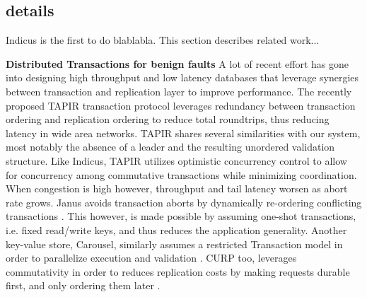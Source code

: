 \iffalse


For ex: Both CF SMR [cite a gazillion] and BFT SMR [cite a gazillion] focus on maintaining a totally ordered log of requests
Permission blockchains, as they rely primarily on BFT constructs similarly maintain this total order
[cite a gazillion]

There is some work that recognizes that this is not scalable and instead tries to only order conflicting ops [Epaxos, Generalised Paxos, Ava, Iota, CPPaxos or whatever it's called], or add sharding [OmniLedger, Herlihy's paper]
In the CF context, layering sharding on top of  replication has been shown to be inefficient [Tapir, Janus]
We argue that we should think of blockchains as a DB. There is some work that does that already [the series of five papers that we talked about]. (one sentence for each on how they build on one other). We expand on that research to be 1) leaderless, scalable, etc
And then maybe after this, as part of reformulating this as a DB problem also need to reformulate the correctness guarantees (cite all work that talks about byzantine clients) 

\fi







\subsection{details}


Indicus is the first to do blablabla. This section describes related work...

\textbf{Distributed Transactions for benign faults}
A lot of recent effort has gone into designing high throughput and low latency databases that leverage synergies between transaction and replication layer to improve performance. The recently proposed TAPIR transaction protocol leverages redundancy between transaction ordering and replication ordering to reduce total roundtrips, thus reducing latency in wide area networks. TAPIR shares several similarities with our system, most notably the absence of a leader and the resulting unordered validation structure. Like Indicus, TAPIR utilizes optimistic concurrency control to allow for concurrency among commutative transactions while minimizing coordination. When congestion is high however, throughput and tail latency worsen as abort rate grows. Janus avoids transaction aborts by dynamically re-ordering conflicting transactions \cite{mu2016consolidating}. This however, is made possible by assuming one-shot transactions, i.e. fixed read/write keys, and thus reduces the application generality. Another key-value store, Carousel, similarly assumes a restricted Transaction model in order to parallelize execution and validation \cite{yan2018carousel}. CURP too, leverages commutativity in order to reduces replication costs by making requests durable first, and only ordering them later \cite{park2019exploiting}. 

